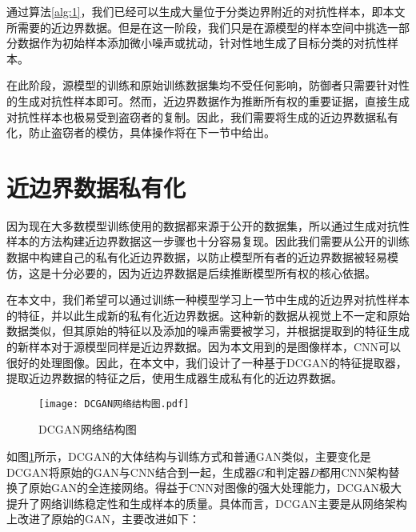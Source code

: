 通过算法\ref{alg:1}，我们已经可以生成大量位于分类边界附近的对抗性样本，即本文所需要的近边界数据。但是在这一阶段，我们只是在源模型的样本空间中挑选一部分数据作为初始样本添加微小噪声或扰动，针对性地生成了目标分类的对抗性样本。

在此阶段，源模型的训练和原始训练数据集均不受任何影响，防御者只需要针对性的生成对抗性样本即可。然而，近边界数据作为推断所有权的重要证据，直接生成对抗性样本也极易受到盗窃者的复制。因此，我们需要将生成的近边界数据私有化，防止盗窃者的模仿，具体操作将在下一节中给出。

\section{近边界数据私有化}\label{3.3}

因为现在大多数模型训练使用的数据都来源于公开的数据集，所以通过生成对抗性样本的方法构建近边界数据这一步骤也十分容易复现。因此我们需要从公开的训练数据中构建自己的私有化近边界数据，以防止模型所有者的近边界数据被轻易模仿，这是十分必要的，因为近边界数据是后续推断模型所有权的核心依据。

在本文中，我们希望可以通过训练一种模型学习上一节中生成的近边界对抗性样本的特征，并以此生成新的私有化近边界数据。这种新的数据从视觉上不一定和原始数据类似，但其原始的特征以及添加的噪声需要被学习，并根据提取到的特征生成的新样本对于源模型同样是近边界数据。因为本文用到的是图像样本，CNN可以很好的处理图像。因此，在本文中，我们设计了一种基于DCGAN\cite{radford2015unsupervised}的特征提取器，提取近边界数据的特征之后，使用生成器生成私有化的近边界数据。

\begin{figure}[htbp]%
	\centering
	\setlength{\abovecaptionskip}{5mm} %
	\setlength{\belowcaptionskip}{-3mm} %
	\texttt{[image: DCGAN网络结构图.pdf]}
	\caption{DCGAN网络结构图}
	\label{DCGAN网络结构图}
	\end {figure}
	
如图\ref{DCGAN网络结构图}所示，DCGAN的大体结构与训练方式和普通GAN类似，主要变化是DCGAN将原始的GAN与CNN结合到一起，生成器$G$和判定器$D$都用CNN架构替换了原始GAN的全连接网络。得益于CNN对图像的强大处理能力，DCGAN极大提升了网络训练稳定性和生成样本的质量。具体而言，DCGAN主要是从网络架构上改进了原始的GAN，主要改进如下：

